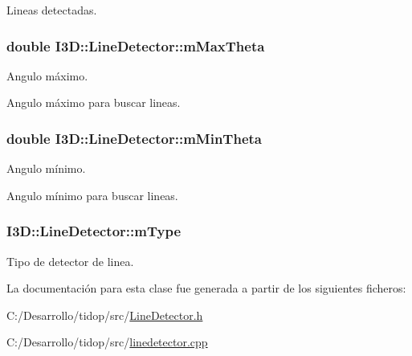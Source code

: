 Lineas detectadas. 

\subsubsection[{\texorpdfstring{m\+Max\+Theta}{mMaxTheta}}]{\setlength{\rightskip}{0pt plus 5cm}double I3\+D\+::\+Line\+Detector\+::m\+Max\+Theta\hspace{0.3cm}{\ttfamily [protected]}}\hypertarget{class_i3_d_1_1_line_detector_afbb629bc06fdc61296e03b93506e0c37}{}\label{class_i3_d_1_1_line_detector_afbb629bc06fdc61296e03b93506e0c37}


Angulo máximo. 

Angulo máximo para buscar lineas. 
\subsubsection[{\texorpdfstring{m\+Min\+Theta}{mMinTheta}}]{\setlength{\rightskip}{0pt plus 5cm}double I3\+D\+::\+Line\+Detector\+::m\+Min\+Theta\hspace{0.3cm}{\ttfamily [protected]}}\hypertarget{class_i3_d_1_1_line_detector_a3d359c9077a01c74308c4c05975a17d5}{}\label{class_i3_d_1_1_line_detector_a3d359c9077a01c74308c4c05975a17d5}


Angulo mínimo. 

Angulo mínimo para buscar lineas. 
\subsubsection[{\texorpdfstring{m\+Type}{mType}}]{ I3\+D\+::\+Line\+Detector\+::m\+Type\hspace{0.3cm}{\ttfamily [protected]}}\hypertarget{class_i3_d_1_1_line_detector_ae988a8bc160374b7314ccff2495deced}{}\label{class_i3_d_1_1_line_detector_ae988a8bc160374b7314ccff2495deced}


Tipo de detector de linea. 



La documentación para esta clase fue generada a partir de los siguientes ficheros\+:\begin{DoxyCompactItemize}
\item 
C\+:/\+Desarrollo/tidop/src/\hyperlink{_line_detector_8h}{Line\+Detector.\+h}\item 
C\+:/\+Desarrollo/tidop/src/\hyperlink{linedetector_8cpp}{linedetector.\+cpp}\end{DoxyCompactItemize}
